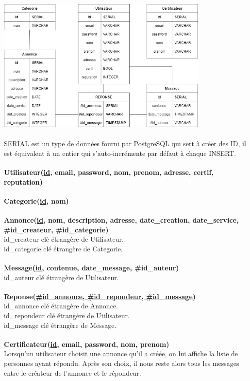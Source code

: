 \documentclass[a4paper,11pt]{article}
\begin{document}
\includegraphics[width=400px]{images/Schema-relationnel-BDD.png}\\\\
SERIAL est un type de données fourni par PostgreSQL qui sert à créer des ID, il est équivalent à un entier qui s'auto-incrémente par défaut à chaque INSERT.\\\\
\textbf{Utilisateur(\underline{id}, email, password, nom, prenom, adresse, certif, reputation)}\\\\
\textbf{Categorie(\underline{id}, nom)}\\\\
\textbf{Annonce(\underline{id}, nom, description, adresse, date\_creation, date\_service, \#id\_createur, \#id\_categorie)}\\
id\_createur clé étrangère de Utilisateur.\\
id\_categorie clé étrangère de Categorie.\\\\
\textbf{Message(\underline{id}, contenue, date\_message, \#id\_auteur)}\\
id\_auteur clé étrangère de Utilisateur.\\\\
\textbf{Reponse(\underline{\#id\_annonce, \#id\_repondeur, \#id\_message})}\\
id\_annonce clé étrangère de Annonce.\\
id\_repondeur clé étrangère de Utilisateur.\\
id\_message clé étrangère de Message.\\\\
\textbf{Certificateur(\underline{id}, email, password, nom, prenom)}\\

Lorsqu'un utilisateur choisit une annonce qu'il a créée, on lui affiche la liste de personnes ayant répondu. Après son choix, il nous reste alors tous les messages entre le créateur de l'annonce et le répondeur.
\end{document}
